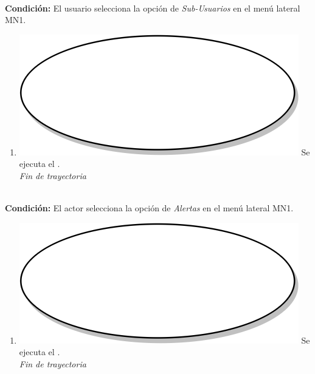 \textbf{} \\
\textbf{Condición:} El usuario selecciona la opción de \textit{Sub-Usuarios} en el menú lateral MN1. \\
 \begin{enumerate}[label=N\arabic*]
    \item {\includegraphics[scale=.05]{Capitulo3/img/proceso.png} Se ejecuta el \textbf{}.} \\
    \textit{Fin de trayectoria} \\
\end{enumerate}

\textbf{} \\
\textbf{Condición:} El actor selecciona la opción de \textit{Alertas} en el menú lateral MN1. \\
 \begin{enumerate}[label=O\arabic*]
    \item {\includegraphics[scale=.05]{Capitulo3/img/proceso.png} Se ejecuta el \textbf{}.} \\
    \textit{Fin de trayectoria} \\
\end{enumerate}